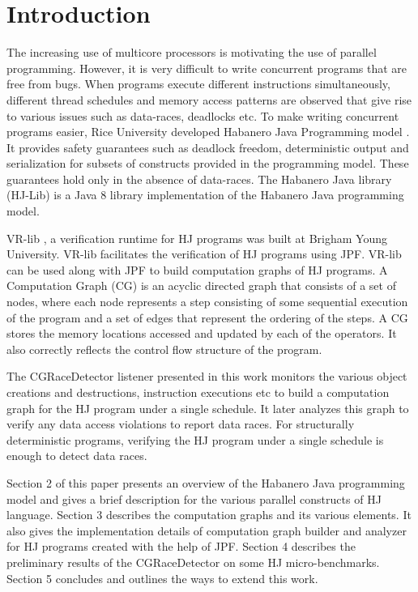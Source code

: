 \section{Introduction}
The increasing use of multicore processors is motivating the use of parallel programming. However, it is very difficult to write concurrent programs that are free from bugs. When programs execute different instructions simultaneously, different thread schedules and memory access patterns are observed that give rise to various issues such as data-races, deadlocks etc. To make writing concurrent programs easier, Rice University developed Habanero Java Programming model \cite{Cave:2011:HNA:2093157.2093165}. It provides safety guarantees such as deadlock freedom, deterministic output and serialization for subsets of constructs provided in the programming model. These guarantees hold only in the absence of data-races. The Habanero Java library (HJ-Lib) \cite{hj-lib} is a Java 8 library implementation of the Habanero Java programming model.

VR-lib \cite{Anderson:2015:JVH:2693208.2693245}, a verification runtime for HJ programs was built at Brigham Young University. VR-lib facilitates the verification of HJ programs using JPF. VR-lib can be used along with JPF to build computation graphs of HJ programs. A Computation Graph (CG) is an acyclic directed graph that consists of a set of nodes, where each node represents a step consisting of some sequential execution of the program and a set of edges that represent the ordering of the steps. A CG stores the memory locations accessed and updated by each of the operators. It also correctly reflects the control flow structure of the program.

The CGRaceDetector listener presented in this work monitors the various object creations and destructions, instruction executions etc to build a computation graph for the HJ program under a single schedule. It later analyzes this graph to verify any data access violations to report data races. For structurally deterministic programs, verifying the HJ program under a single schedule is enough to detect data races.

Section 2 of this paper presents an overview of the Habanero Java programming model and gives a brief description for the various parallel constructs of HJ language. Section 3 describes the computation graphs and its various elements. It also gives the implementation details of computation graph builder and analyzer for HJ programs created with the help of JPF. Section 4 describes the preliminary results of the CGRaceDetector on some HJ micro-benchmarks. Section 5 concludes and outlines the ways to  extend this work.
